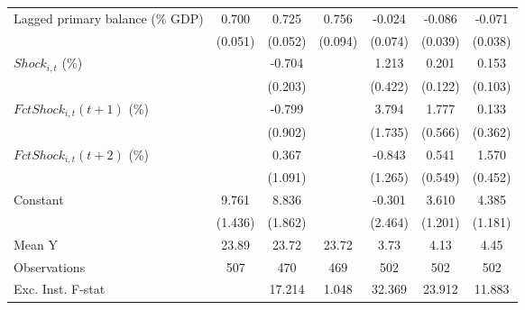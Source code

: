 {\begin{tabular}{l*{6}{c}}
\addlinespace
Lagged primary balance (\% GDP)&       0.700\sym{***}&       0.725\sym{***}&       0.756\sym{***}&      -0.024         &      -0.086\sym{**} &      -0.071\sym{*}  \\
                    &     (0.051)         &     (0.052)         &     (0.094)         &     (0.074)         &     (0.039)         &     (0.038)         \\
\addlinespace
$ Shock_{i,t}$ (\%) &                     &      -0.704\sym{***}&                     &       1.213\sym{***}&       0.201         &       0.153         \\
                    &                     &     (0.203)         &                     &     (0.422)         &     (0.122)         &     (0.103)         \\
\addlinespace
$ FctShock_{i,t}(t+1)$ (\%)&                     &      -0.799         &                     &       3.794\sym{**} &       1.777\sym{***}&       0.133         \\
                    &                     &     (0.902)         &                     &     (1.735)         &     (0.566)         &     (0.362)         \\
\addlinespace
$ FctShock_{i,t}(t+2)$ (\%)&                     &       0.367         &                     &      -0.843         &       0.541         &       1.570\sym{***}\\
                    &                     &     (1.091)         &                     &     (1.265)         &     (0.549)         &     (0.452)         \\
\addlinespace
Constant            &       9.761\sym{***}&       8.836\sym{***}&                     &      -0.301         &       3.610\sym{***}&       4.385\sym{***}\\
                    &     (1.436)         &     (1.862)         &                     &     (2.464)         &     (1.201)         &     (1.181)         \\
\midrule
Mean Y              &       23.89         &       23.72         &       23.72         &        3.73         &        4.13         &        4.45         \\
Observations        &         507         &         470         &         469         &         502         &         502         &         502         \\
Exc. Inst. F-stat   &                     &      17.214         &       1.048         &      32.369         &      23.912         &      11.883         \\
\bottomrule
\end{tabular}
}
